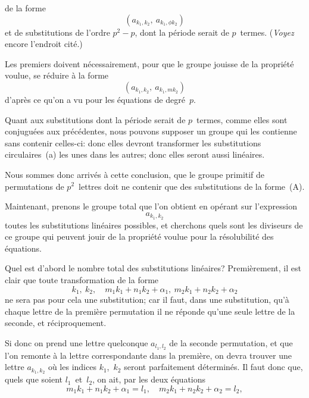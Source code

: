 de la forme
\[
(a_{k_{1},k_{2}},\ a_{k_{1},\phi k_{2}})
\]
et de substitutions de l'ordre $p^{2} - p$, dont la période serait de $p$~termes.
(\emph{Voyez} encore l'endroit cité.)

Les premiers doivent nécessairement, pour que le groupe
jouisse de la propriété voulue, se réduire à la forme
\[
(a_{k_{1},k_{2}},\ a_{k_{1},m k_{2}})
\]
d'après ce qu'on a vu pour les équations de degré~$p$.

Quant aux substitutions dont la période serait de $p$~termes,
comme elles sont conjuguées aux précédentes, nous pouvons supposer
un groupe qui les contienne sans contenir celles-ci: donc
elles devront transformer les substitutions circulaires~\textup{(a)} les unes
dans les autres; donc elles seront aussi linéaires.

Nous sommes donc arrivés à cette conclusion, que le groupe
primitif de permutations de $p^{2}$~lettres doit ne contenir que des
substitutions de la forme~\textup{(A)}.

Maintenant, prenons le groupe total que l'on obtient en opérant
sur l'expression
\[
a_{k_{1},k_{2}}
\]
toutes les substitutions linéaires possibles, et cherchons quels
sont les diviseurs de ce groupe qui peuvent jouir de la propriété
voulue pour la résolubilité des équations.

Quel est d'abord le nombre total des substitutions linéaires?
Premièrement, il est clair que toute transformation de la forme
\[
k_{1},\ k_{2},\quad m_{1}k_{1} + n_{1}k_{2} + \alpha_{1},\ m_{2}k_{1} + n_{2}k_{2} + \alpha_{2}
\]
ne sera pas pour cela une substitution; car il faut, dans une substitution,
qu'à chaque lettre de la première permutation il ne réponde
qu'une seule lettre de la seconde, et réciproquement.

Si donc on prend une lettre quelconque $a_{l_{1},l_{2}}$ de la seconde permutation,
et que l'on remonte à la lettre correspondante dans la
première, on devra trouver une lettre $a_{k_{1},k_{2}}$ où les indices $k_{1}$,~$k_{2}$
seront parfaitement déterminés. Il faut donc que, quels que soient
$l_{1}$~et~$l_{2}$, on ait, par les deux équations
\[
m_{1}k_{1} + n_{1}k_{2} + \alpha_{1} = l_{1}, \quad
m_{2}k_{1} + n_{2}k_{2} + \alpha_{2} = l_{2},
\]
